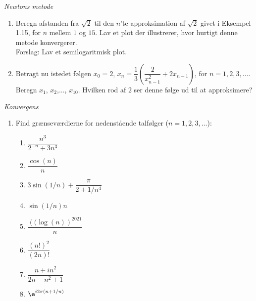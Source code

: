 \begin{opg} \emph{Newtons metode}
	\begin{enumerate}
		\item Beregn afstanden fra $ \sqrt{2} $ til den $ n $'te approksimation af $ \sqrt{2} $ givet i Eksempel 1.15, for $ n $ mellem $ 1 $ og $ 15 $. Lav et plot der illustrerer, hvor hurtigt denne metode konvergerer.\\
		Forslag: Lav et semilogaritmisk plot. 
		\item Betragt nu istedet følgen $ x_0=2 $, $ x_n=\dfrac{1}{3}\left(\dfrac{2}{x_{n-1}^2}+2x_{n-1}\right) $, for $ n=1,2,3,... $. Beregn $ x_1 $, $ x_2 $,..., $ x_{10} $. Hvilken rod af $ 2 $ ser denne f\o{}lge ud til at approksimere?
	\end{enumerate}
\end{opg}



\begin{opg} \emph{Konvergens}
\begin{enumerate}
    \item Find grænseværdierne for nedenstående talfølger ($n = 1,2,3, \ldots$):
	\begin{multicols}{3}
	\begin{enumerate}[label=\roman*)]
	    \item $\dfrac{n^3 }{2^{-n}+3n^3}$
		\item  $ \dfrac{\cos( n)}{n}$
		\item $3 \sin(1/n) + \dfrac{\pi}{2+ 1/n^4}$
		\item $ \sin(1/n)n $
		\item $ \dfrac{\left((\log(n)\right)^{2021}}{n} $
		\item $ \dfrac{(n!)^2}{(2n)!} $
		\item $\dfrac{n+in^2}{2n-n^2+1}$
		\item $ \e^{i2\pi(n+1/n)} $
	\end{enumerate}
	\end{multicols}
\end{enumerate}
\end{opg}

